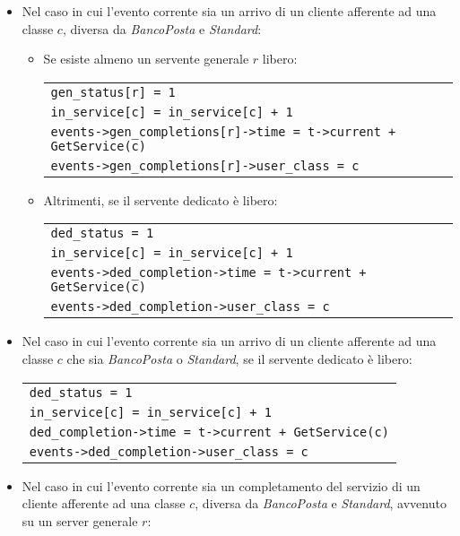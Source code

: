 \begin{itemize}
\item Nel caso in cui l'evento corrente sia un arrivo di un cliente afferente ad una classe $c$, diversa da \sr{} \textsl{BancoPosta} e \sr{} \textsl{Standard}:
\begin{itemize}
\item Se esiste almeno un servente generale $r$ libero:
\begin{center}
\begin{tabular}{l}
\texttt{gen\_status[r] = 1} \\
\texttt{in\_service[c] = in\_service[c] + 1} \\
\texttt{events->gen\_completions[r]->time = t->current + GetService(c)} \\
\texttt{events->gen\_completions[r]->user\_class = c}
\end{tabular}
\end{center}
\item Altrimenti, se il servente dedicato è libero:
\begin{center}
\begin{tabular}{l}
\texttt{ded\_status = 1} \\ 
\texttt{in\_service[c] = in\_service[c] + 1} \\
\texttt{events->ded\_completion->time = t->current + GetService(c)} \\
\texttt{events->ded\_completion->user\_class = c}
\end{tabular}
\end{center}
\end{itemize}
\item Nel caso in cui l'evento corrente sia un arrivo di un cliente afferente ad una classe $c$ che sia \sr{} \textsl{BancoPosta} o \sr{} \textsl{Standard}, se il servente dedicato è libero:
\begin{center}
\begin{tabular}{l}
\texttt{ded\_status = 1} \\
\texttt{in\_service[c] = in\_service[c] + 1} \\
\texttt{ded\_completion->time = t->current + GetService(c)} \\
\texttt{events->ded\_completion->user\_class = c}
\end{tabular}
\end{center}
\item Nel caso in cui l'evento corrente sia un completamento del servizio di un cliente afferente ad una classe $c$, diversa da \sr{} \textsl{BancoPosta} e \sr{} \textsl{Standard}, avvenuto su un server generale $r$:

\end{itemize}
